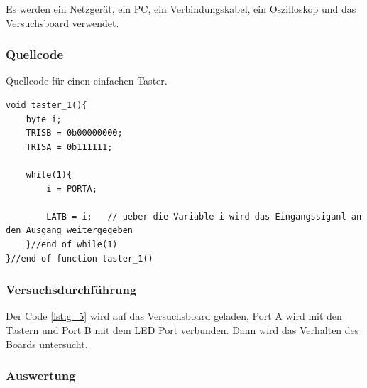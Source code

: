 \documentclass[12pt,a4paper]{article}
\begin{document}
Es werden ein Netzgerät, ein PC, ein Verbindungskabel, ein Oszilloskop und das Versuchsboard verwendet.

\subsubsection*{Quellcode}

Quellcode für einen einfachen Taster.

\lstset{language=C, basicstyle=\tiny}
\begin{lstlisting}[caption = {Einfachster Version eines Schalters}, label=lst:g_5,captionpos=b]
void taster_1(){
	byte i;
	TRISB = 0b00000000;
	TRISA = 0b111111;
	
	while(1){
		i = PORTA;
		
		LATB = i;	// ueber die Variable i wird das Eingangssiganl an den Ausgang weitergegeben
	}//end of while(1)
}//end of function taster_1()
\end{lstlisting}

\subsubsection*{Versuchsdurchführung}

Der Code \ref{lst:g_5} wird auf das Versuchsboard geladen, Port A wird mit den Tastern und Port B mit dem LED Port verbunden. Dann wird das Verhalten des Boards untersucht.

\subsubsection*{Auswertung}
\end{document}
